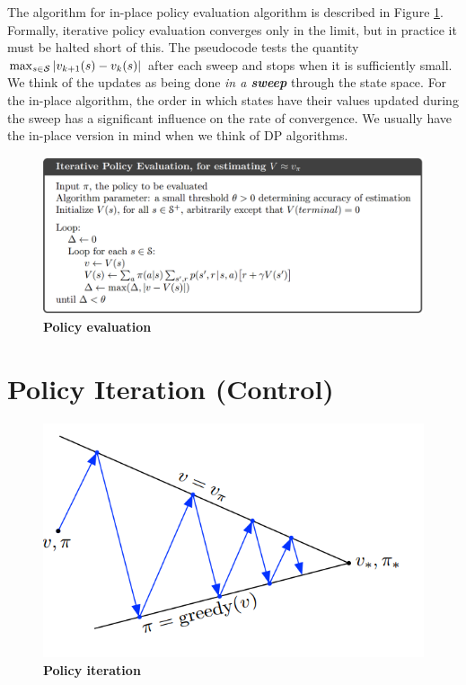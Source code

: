 \documentclass[11pt]{article}
\begin{document}
The algorithm for in-place policy evaluation algorithm is described in Figure \ref{fig: policy_evaluation_dp}. Formally, iterative policy evaluation converges only in the limit, but in practice it must be halted short of this. The pseudocode tests the quantity $\max_{s\in {\mathcal S}} |v_{k+1}(s)-v_{k}(s)|$ after each sweep and stops when it is sufficiently small. We think of the updates as being done \emph{in a \textbf{sweep}} through the state space. For the in-place algorithm, the order in which states have their values updated during the sweep has a significant influence on the rate of convergence. We usually have the in-place version in mind when we think of DP algorithms.
\begin{figure}
\begin{minipage}[t]{1\linewidth}
  \centering
  \centerline{\includegraphics[scale = 0.3]{policy_evaluation_dp.png}}
\end{minipage}
\caption{\footnotesize{\textbf{Policy evaluation  \citep{sutton2018reinforcement}}}}
\label{fig: policy_evaluation_dp}
\end{figure}

\section{Policy Iteration (Control)}
\begin{figure}
\begin{minipage}[t]{1\linewidth}
  \centering
  \centerline{\includegraphics[scale = 0.3]{policy_iteration.png}}
\end{minipage}
\caption{\footnotesize{\textbf{Policy iteration}}}
\label{fig: policy_iteration}
\end{figure}
\end{document}
